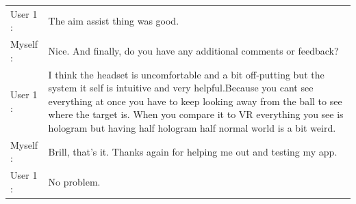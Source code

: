 \documentclass[ %
                author={Finn Alexander Wilkinson},
                supervisor={Dr. Andrew Calway},
                degree={MEng},
                title={\centering A Mixed Reality Aim Assistant for Pool and Snooker},
                subtitle={},
                type={Enterprise},
                year={2021} ]{dissertation}
\begin{document}
\begin{tabular}{l p{130mm}}
    User 1 : & The aim assist thing was good.\\
    Myself : & Nice. And finally, do you have any additional comments or feedback? \\
    User 1 : & I think the headset is uncomfortable and a bit off-putting but the system it self is intuitive and very helpful.Because you cant see everything at once you have to keep looking away from the ball to see where the target is. When you compare it to VR everything you see is hologram but having half hologram half normal world is a bit weird.\\
    Myself : & Brill, that's it. Thanks again for helping me out and testing my app. \\
    User 1 : & No problem. \\
\end{tabular}
\end{document}
